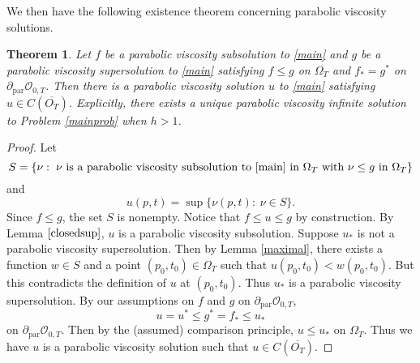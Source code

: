 \documentclass[12pt]{amsart}
\newtheorem{thm}{Theorem}[section]
\theoremstyle{definition}
\theoremstyle{remark}
\numberwithin{equation}{section}
\begin{document}
We then have the following existence theorem concerning parabolic viscosity solutions.
\begin{thm}\label{exist}
Let $f$ be a parabolic viscosity subsolution to \eqref{main} and $g$ be a parabolic viscosity supersolution to \eqref{main} satisfying $f \leq g$ on $\Omega_T$ and $f_* = g^*$ on ${\partial}_{\operatorname{par}}\mathcal{O}_{0,T}$.  Then there is a parabolic viscosity solution $u$ to \eqref{main} satisfying $u \in C(\overline{O_T})$. Explicitly, there exists a unique parabolic viscosity infinite solution to Problem \ref{mainprob} when $h>1$. 
\end{thm}
\begin{proof}
Let 
$$S = \{\nu : \hspace{3pt} \nu \text{ is a parabolic viscosity subsolution to \eqref{main} in } \Omega_T \text{ with } \nu \leq g \text{ in } \Omega_T\}$$
and
$$ u(p,t) = \sup \{ \nu(p,t) : \hspace{3pt} \nu \in S\}.$$
Since $f \leq g$, the set $S$ is nonempty.  Notice that $f\leq u \leq g$ by construction.  By Lemma $\eqref{closedsup}$, $u$ is a parabolic viscosity subsolution.  Suppose $u_*$ is not a parabolic viscosity supersolution.  Then by Lemma \ref{maximal}, there exists a function $w \in S$ and a point $(p_0,t_0) \in \Omega_T$ such that $u(p_0,t_0) < w(p_0,t_0)$.  But this contradicts the definition of $u$ at $(p_0,t_0)$.  Thus $u_*$ is a parabolic viscosity supersolution. By our assumptions on $f$ and $g$ on ${\partial}_{\operatorname{par}}\mathcal{O}_{0,T}$, 
$$u=u^* \leq g^* = f_* \leq u_*$$
on ${\partial}_{\operatorname{par}}\mathcal{O}_{0,T}$.  Then by the (assumed) comparison principle,  $u \leq u_*$ on $\Omega_T$.  Thus we have $u$ is a parabolic viscosity solution such that $u \in C(\overline{O_T})$.  
\end{proof}
\end{document}
